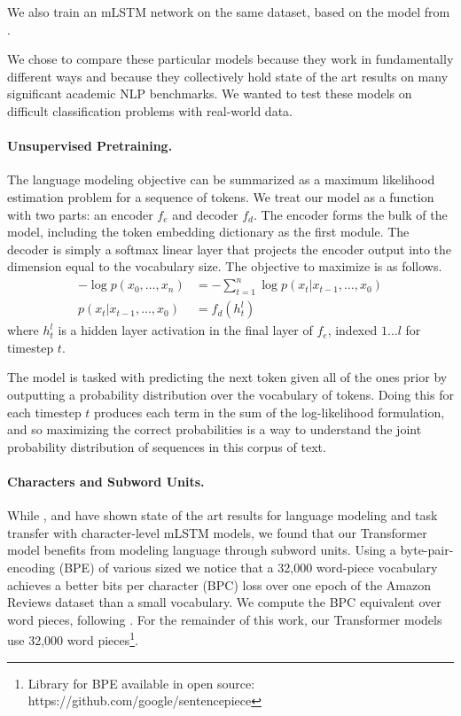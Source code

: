 \documentclass[letterpaper]{article} \usepackage{aaai19}  \usepackage{times}  \usepackage{helvet}  \usepackage{courier}  \usepackage{url}  \usepackage{graphicx}  \usepackage{booktabs}
\begin{document}
We also train an mLSTM network on the same dataset, based on the model from \protect\cite{Puri2018}. 

We chose to compare these particular models because they work in fundamentally different ways and because they collectively hold state of the art results on many significant academic NLP benchmarks. We wanted to test these models on difficult classification problems with real-world data. 


\paragraph{Unsupervised Pretraining.} 
The language modeling objective can be summarized as a maximum likelihood estimation problem for a sequence of tokens. We treat our model as a function with two parts: an encoder $f_e$ and decoder $f_d$. The encoder forms the bulk of the model, including the token embedding dictionary as the first module. The decoder is simply a softmax linear layer that projects the encoder output into the dimension equal to the vocabulary size. The objective to maximize is as follows. 
\begin{align*}
-\log{p(x_0,\ldots, x_n)} &= -\sum_{t=1}^n \log{p(x_t | x_{t-1}, \ldots, x_0)} \\
p(x_t | x_{t-1}, \ldots, x_0) &= f_d(h^l_t)
\end{align*}
where $h^l_t$ is a hidden layer activation in the final layer of $f_e$, indexed $1 \ldots l$ for timestep $t$. 

The model is tasked with predicting the next token given all of the ones prior by outputting a probability distribution over the vocabulary of tokens. Doing this for each timestep $t$ produces each term in the sum of the log-likelihood formulation, and so maximizing the correct probabilities is a way to understand the joint probability distribution of sequences in this corpus of text. 



\paragraph{Characters and Subword Units.}
While \protect\cite{Radford2017}, \protect\cite{Gray2017} and \cite{Puri2018} have shown state of the art results for language modeling and task transfer with character-level mLSTM models, we found that our Transformer model benefits from modeling language through subword units. Using a byte-pair-encoding (BPE) \protect\cite{BPE2015} of various sized we notice that a 32,000 word-piece vocabulary achieves a better bits per character (BPC) loss over one epoch of the Amazon Reviews dataset \protect\cite{McAuley2015} than a small vocabulary. We compute the BPC equivalent over word pieces, following \protect\cite{SubwordMikolov2012}. 
For the remainder of this work, our Transformer models use 32,000 word pieces\footnote{Library for BPE available in open source: https://github.com/google/sentencepiece}. 
\end{document}
